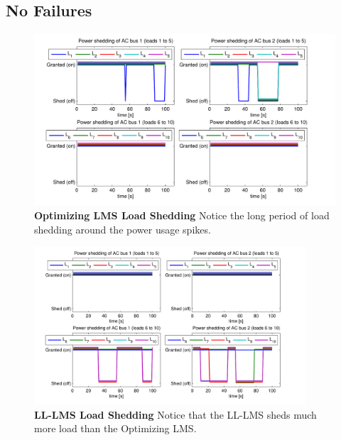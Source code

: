 \documentclass{acm_proc_article-sp}
\begin{document}
\subsection{No Failures}
\begin{figure}[hp]
  \centering
  \includegraphics[width=\textwidth]{figures/lshlnofail}
  \caption{\textbf{Optimizing LMS Load Shedding} Notice the long
  period of load shedding around the power usage spikes.}
  \label{fig:lshlnofail}
\end{figure}
\begin{figure}[hp]
  \centering
  \includegraphics[width=0.9\textwidth]{figures/lsllnofail}
  \caption{\textbf{LL-LMS Load Shedding} Notice that the 
  LL-LMS sheds much more load than the Optimizing LMS.}
  \label{fig:lsllnofail}
\end{figure}
\end{document}
